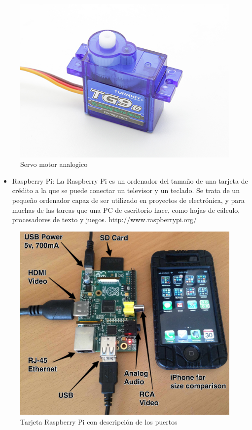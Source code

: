 \begin{figure}[hbtp]

\centering
\includegraphics[scale=0.3]{imagenes/turnigy.jpg}
\caption{Servo motor analogico}
\end{figure}

\begin{itemize}
\item Raspberry Pi: La Raspberry Pi es un ordenador del tamaño de una tarjeta de crédito a la que se puede conectar un televisor y un teclado. Se trata de un pequeño ordenador capaz de ser utilizado en proyectos de electrónica, y para muchas de las tareas que una PC de escritorio hace, como hojas de cálculo, procesadores de texto y juegos. http://www.raspberrypi.org/ 




\end{itemize}
\begin{figure}[hbtp]

\centering
\includegraphics[scale=0.1]{imagenes/raspberry_pi_iphone.jpg}
\caption{Tarjeta Raspberry Pi con descripción de los puertos}
\end{figure}

